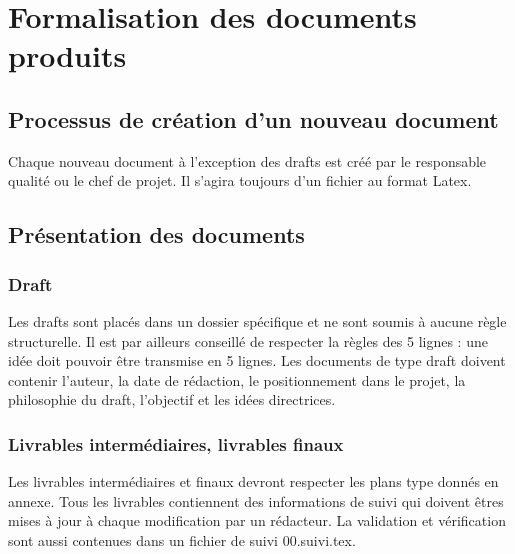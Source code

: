 \section{Formalisation des documents produits}
\subsection{Processus de création d'un nouveau document}
Chaque nouveau document à l'exception des drafts est créé par le responsable 
qualité ou le chef de projet. Il s'agira toujours d'un fichier au format Latex.
\subsection{Présentation des documents}
\subsubsection{Draft}
Les drafts sont placés dans un dossier spécifique et ne sont soumis à aucune 
règle structurelle. Il est par ailleurs conseillé de respecter la règles des 
5 lignes : une idée doit pouvoir être transmise en 5 lignes.
Les documents de type draft doivent contenir l'auteur, la date de rédaction, 
le positionnement dans le projet, la philosophie du draft, l'objectif et les 
idées directrices.
\subsubsection{Livrables intermédiaires, livrables finaux}
Les livrables intermédiaires et finaux devront respecter les plans type donnés 
en annexe. 
Tous les livrables contiennent des informations de suivi qui doivent êtres 
mises à jour à chaque modification par un rédacteur. La validation et 
vérification sont aussi contenues dans un fichier de suivi 00.suivi.tex.
